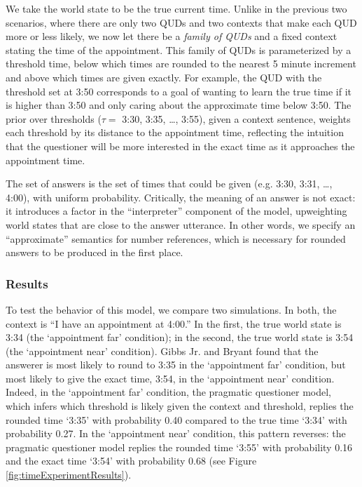 \documentclass[12pt, floatsintext, jou]{apa6}
\begin{document}
We take the world state to be the true current time. Unlike in the previous two scenarios, where there are only two QUDs  and two contexts that make each QUD more or less likely, we now let there be a \emph{family of QUDs} and a fixed context stating the time of the appointment. This family of QUDs is parameterized by a threshold time, below which times are rounded to the nearest 5 minute increment and above which times are given exactly. For example, the QUD with the threshold set at 3:50 corresponds to a goal of wanting to learn the true time if it is higher than 3:50 and only caring about the approximate time below 3:50. The prior over thresholds ($\tau =$ 3:30, 3:35, \dots, 3:55), given a context sentence, weights each threshold by its distance to the appointment time, reflecting the intuition that the questioner will be more interested in the exact time as it approaches the appointment time.

 The set of answers is the set of times that could be given (e.g. 3:30, 3:31, \dots, 4:00), with uniform probability. Critically, the meaning of an answer is not exact: it introduces a factor in the ``interpreter'' component of the model, upweighting world states that are close to the answer utterance. In other words, we specify an ``approximate'' semantics for number references, which is necessary for rounded answers to be produced in the first place.
 
 
 
 \subsubsection{Results}
 
 To test the behavior of this model, we compare two simulations. In both, the context is ``I have an appointment at 4:00.'' In the first, the true world state is 3:34 (the `appointment far' condition); in the second, the true world state is 3:54 (the `appointment near' condition). Gibbs Jr. and Bryant \citeyear{GibbsBryant08_OptimalRelevance} found that the answerer is most likely to round to 3:35 in the `appointment far' condition, but most likely to give the exact time, 3:54, in the `appointment near' condition. Indeed, in the `appointment far' condition, the pragmatic questioner model, which infers which threshold is likely given the context and threshold, replies the rounded time `3:35' with probability 0.40 compared to the true time `3:34' with probability 0.27. In the `appointment near' condition, this pattern reverses: the pragmatic questioner model replies the rounded time `3:55' with probability 0.16 and the exact time `3:54' with probability 0.68 (see Figure \ref{fig:timeExperimentResults}).
 
\end{document}
